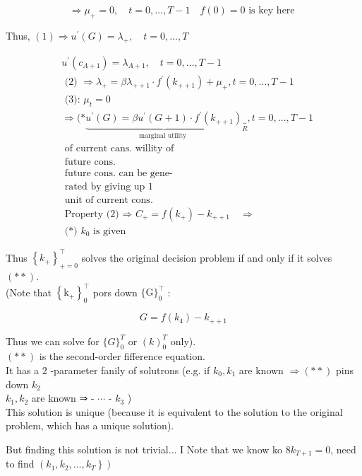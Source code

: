 \documentclass[10pt]{article}
\begin{document}
$$
\Rightarrow \mu_{+}=0, \quad t=0, \ldots, T-1 \quad f(0)=0 \text { is key here }
$$

Thus, $(1) \Rightarrow u^{\prime}(G)=\lambda_{+}, \quad t=0, \ldots, T$

$$
\begin{aligned}
& u^{\prime}\left(c_{A+1}\right)=\lambda_{A+1}, \quad t=0, \ldots, T-1 \\
& \text { (2) } \Rightarrow \lambda_{+}=\beta \lambda_{++1} \cdot f^{\prime}\left(k_{++1}\right)+\mu_{+}, t=0, \ldots, T-1 \\
& \text { (3): } \mu_{t}=0 \\
& \Rightarrow(* \underbrace{u^{\prime}(G)=\beta u^{\prime}(G+1) \cdot f^{\prime}\left(k_{++1}\right)}_{\text {marginal utility }} \underbrace{}_{R}, t=0, \ldots, T-1 \\
& \text { of current cans. willity of } \\
& \text { future cons. } \\
& \text { future cons. can be gene- } \\
& \text { rated by giving up } 1 \\
& \text { unit of current cons. } \\
& \text { Property (2) ⇒ } C_{+}=f\left(k_{+}\right)-k_{++1} \quad \Rightarrow \\
& \text { (*) } k_{0} \text { is given }
\end{aligned}
$$

Thus $\left\{k_{+}\right\}_{+=0}^{\top}$ solves the original decision problem if and only if it solves $(* *)$.\\
(Note that $\left\{\mathrm{k}_{+}\right\}_{0}^{\top}$ pors down $\{\mathrm{G}\}_{0}^{\top}$ :

$$
G=f\left(k_{4}\right)-k_{++1}
$$

Thus we can solve for $\{G\}_{0}^{T}$ or $(k)_{0}^{T}$ only).\\
$(* *)$ is the second-order fifference equation.\\
It has a 2 -parameter fanily of solutrons (e.g. if $k_{0}, k_{1}$ are known $\Rightarrow(* *)$ pins down $k_{2}$\\
$k_{1}, k_{2}$ are known ⇒ - $\cdots$ - $k_{3}$ )\\
This solution is unique (because it is equivalent to the solution to the original problem, which has a unique solution).

But finding this solution is not trivial... I Note that we know ko $8 k_{T+1}=0$, need to find $\left.\left(k_{1}, k_{2}, \ldots, k_{T}\right\}\right)$
\end{document}
